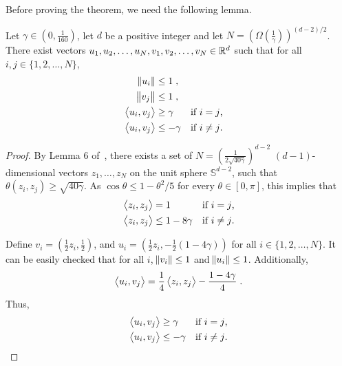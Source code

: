 Before proving the theorem, we need the following lemma.

\begin{lemma}
\label{lemma:embed_d_gamma}
Let $\gamma \in (0,\frac 1 {160})$, let $d$ be a positive integer and let $N = (\Omega(\frac{1}{\gamma}))^{(d-2)/2}$.
There exist vectors $u_1, u_2, \dots, u_N, v_1, v_2, \dots, v_N \in \mathbb{R}^d$ such that for all $i, j \in \{1,2,\dots,N\}$,
\begin{align*}
\norm{u_i} & \le 1 \; , \\
\norm{v_j} & \le 1 \; , \\
\left\langle u_i, v_j \right\rangle & \ge \gamma & & \text{if $i=j$,} \\
\left\langle u_i, v_j \right\rangle & \le -\gamma & & \text{if $i \neq j$.}
\end{align*}
\end{lemma}

\begin{proof}
By Lemma 6 of~\cite{Long-1995}, there exists a set of $N =
(\frac{1}{2\sqrt{40\gamma}})^{d-2}$ $(d-1)$-dimensional vectors $z_1, \ldots,
z_N$ on the unit sphere $\mathbb{S}^{d-2}$, such that $\theta(z_i, z_j) \ge
\sqrt{40 \gamma}$. As $\cos\theta \le 1-\theta^2/5$ for every $\theta \in
[0,\pi]$, this implies that
\begin{align*}
\left\langle z_i, z_j \right\rangle &= 1 && \text{if $i = j$,} \\
\left\langle z_i, z_j \right\rangle &\le 1 - 8\gamma && \text{if $i \neq j$.}
\end{align*}

Define $v_i = (\frac12 z_i, \frac12)$, and $u_i = (\frac{1}{2} z_i, -\frac{1}{2}(1-4\gamma))$ for all $i \in \{1,2,\dots,N\}$.
It can be easily checked that for all $i$,
$\norm{v_i} \le 1$ and $\norm{u_i} \le 1$. Additionally,
$$
\left\langle u_i, v_j \right\rangle = \frac{1}{4} \left\langle z_i, z_j \right\rangle - \frac {1-4\gamma} 4 \; .
$$
Thus,
\begin{align*}
\left\langle u_i, v_j \right\rangle &\ge \gamma && \text{if $i=j$,} \\
\left\langle u_i, v_j \right\rangle &\le -\gamma && \text{if $i \neq j$.}
\end{align*}
\end{proof}

